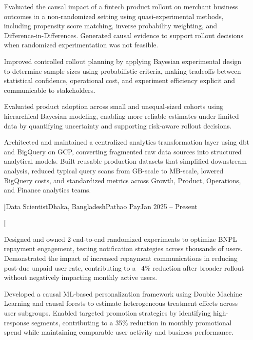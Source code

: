 \documentclass[10pt]{article}
\begin{document}
  \item Evaluated the causal impact of a fintech product rollout on merchant
  business outcomes in a non-randomized setting using quasi-experimental
  methods, including propensity score matching, inverse probability weighting,
  and Difference-in-Differences. Generated causal evidence to support rollout
  decisions when randomized experimentation was not feasible.

  \item Improved controlled rollout planning by applying Bayesian experimental
  design to determine sample sizes using probabilistic criteria, making tradeoffs
  between statistical confidence, operational cost, and experiment efficiency
  explicit and communicable to stakeholders.

  \item Evaluated product adoption across small and unequal-sized cohorts using
  hierarchical Bayesian modeling, enabling more reliable estimates under limited
  data by quantifying uncertainty and supporting risk-aware rollout decisions.

  \item Architected and maintained a centralized analytics transformation layer
  using dbt and BigQuery on GCP, converting fragmented raw data sources into
  structured analytical models. Built reusable production datasets that simplified
  downstream analysis, reduced typical query scans from GB-scale to MB-scale,
  lowered BigQuery costs, and standardized metrics across Growth, Product,
  Operations, and Finance analytics teams.

]{Data Scientist}{Dhaka, Bangladesh}{Pathao Pay}{Jan 2025 -- Present}

\medskip

\cvblock[
  \item Designed and owned 2 end-to-end randomized experiments to optimize BNPL
  repayment engagement, testing notification strategies across thousands of users.
  Demonstrated the impact of increased repayment communications in reducing
  post-due unpaid user rate, contributing to a ~4\% reduction after broader rollout without
  negatively impacting monthly active users.

  \item Developed a causal ML-based personalization framework using Double Machine
  Learning and causal forests to estimate heterogeneous treatment effects across
  user subgroups. Enabled targeted promotion strategies by identifying high-response
  segments, contributing to a 35\% reduction in monthly promotional spend while
  maintaining comparable user activity and business performance.
\end{document}
